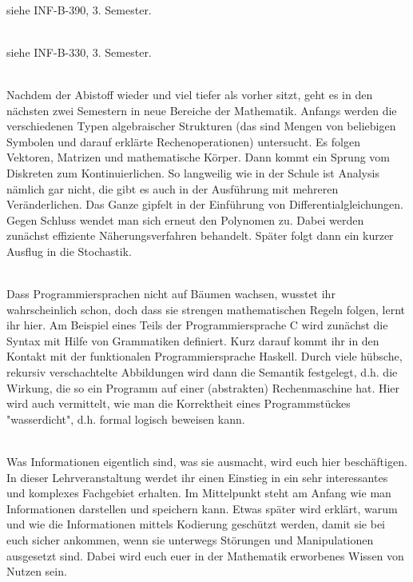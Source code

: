 \textbf{} \\
siehe INF-B-390, 3. Semester.

\textbf{} \\
siehe INF-B-330, 3. Semester.


\textbf{} \\
Nachdem der Abistoff wieder und viel tiefer als vorher sitzt, geht es in den nächsten zwei Semestern in neue Bereiche der Mathematik.
Anfangs werden die verschiedenen Typen algebraischer Strukturen (das sind Mengen von beliebigen Symbolen und darauf erklärte Rechenoperationen) untersucht.
Es folgen Vektoren, Matrizen und mathematische Körper.
Dann kommt ein Sprung vom Diskreten zum Kontinuierlichen.
So langweilig wie in der Schule ist Analysis nämlich gar nicht, die gibt es auch in der Ausführung mit mehreren Veränderlichen.
Das Ganze gipfelt in der Einführung von Differentialgleichungen.
Gegen Schluss wendet man sich erneut den Polynomen zu.
Dabei werden zunächst effiziente Näherungsverfahren behandelt.
Später folgt dann ein kurzer Ausflug in die Stochastik.

\textbf{} \\
Dass Programmiersprachen nicht auf Bäumen wachsen, wusstet ihr wahrscheinlich schon, doch dass sie strengen mathematischen Regeln folgen, lernt ihr hier.
Am Beispiel eines Teils der Programmiersprache C wird zunächst die Syntax mit Hilfe von Grammatiken definiert.
Kurz darauf kommt ihr in den Kontakt mit der funktionalen Programmiersprache Haskell.
Durch viele hübsche, rekursiv verschachtelte Abbildungen wird dann die Semantik festgelegt, d.h. die Wirkung, die so ein Programm auf einer (abstrakten) Rechenmaschine hat.
Hier wird auch vermittelt, wie man die Korrektheit eines Programmstückes "wasserdicht", d.h. formal logisch beweisen kann.

\textbf{} \\
Was Informationen eigentlich sind, was sie ausmacht, wird euch hier beschäftigen.
In dieser Lehrveranstaltung werdet ihr einen Einstieg in ein sehr interessantes und komplexes Fachgebiet erhalten.
Im Mittelpunkt steht am Anfang wie man Informationen darstellen und speichern kann.
Etwas später wird erklärt, warum und wie die Informationen mittels Kodierung geschützt werden, damit sie bei euch sicher ankommen, wenn sie unterwegs Störungen und Manipulationen ausgesetzt sind.
Dabei wird euch euer in der Mathematik erworbenes Wissen von Nutzen sein.

